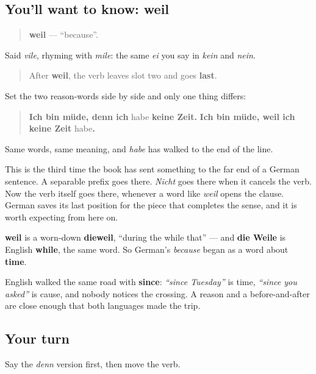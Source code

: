 \subsection*{You'll want to know: weil}
\begin{quote}
\textbf{weil} — \textquotedblleft{}because\textquotedblright{}.
\end{quote}

Said \emph{vile}, rhyming with \emph{mile}: the same \emph{ei} you say in \emph{kein} and \emph{nein}.

\begin{grammarlens}[title={Grammar Lens: the verb travels to the far end}]
\begin{quote}
After \textbf{weil}, the verb leaves slot two and goes \textbf{last}.
\end{quote}

Set the two reason-words side by side and only one thing differs:

\begin{quote}
\textbf{Ich bin müde, denn ich }habe\textbf{ keine Zeit.} \textbf{Ich bin müde, weil ich keine Zeit }habe\textbf{.}
\end{quote}

Same words, same meaning, and \emph{habe} has walked to the end of the line.

This is the third time the book has sent something to the far end of a German sentence. A separable prefix goes there. \emph{Nicht} goes there when it cancels the verb. Now the verb itself goes there, whenever a word like \emph{weil} opens the clause. German saves its last position for the piece that completes the sense, and it is worth expecting from here on.
\end{grammarlens}

\begin{cousinweb}
\textbf{weil} is a worn-down \textbf{dieweil}, \textquotedblleft{}during the while that\textquotedblright{} — and \textbf{die Weile} is English \textbf{while}, the same word. So German's \emph{because} began as a word about \textbf{time}.

English walked the same road with \textbf{since}: \emph{\textquotedblleft{}since Tuesday\textquotedblright{}} is time, \emph{\textquotedblleft{}since you asked\textquotedblright{}} is cause, and nobody notices the crossing. A reason and a before-and-after are close enough that both languages made the trip.
\end{cousinweb}

\subsection*{Your turn}
Say the \emph{denn} version first, then move the verb.

